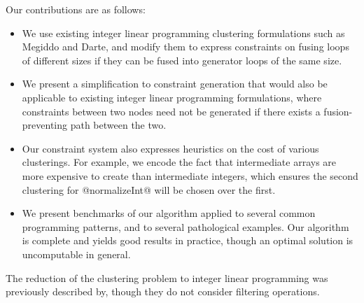 Our contributions are as follows:

\begin{itemize}
\item   
We use existing integer linear programming clustering formulations such as Megiddo\cite{megiddo1998optimal} and Darte\cite{darte2002contraction},
and modify them to express constraints on fusing loops of different sizes if they can be fused into generator loops of the same size.

\item
We present a simplification to constraint generation that would also be applicable to existing integer linear programming formulations,
where constraints between two nodes need not be generated if there exists a fusion-preventing path between the two. 

\item   Our constraint system also expresses heuristics on the cost of various clusterings. For example, we encode the fact that intermediate arrays are more expensive to create than intermediate integers, which ensures the second clustering for @normalizeInt@ will be chosen over the first. 

\item   We present benchmarks of our algorithm applied to several common programming patterns, and to several pathological examples. Our algorithm is complete and yields good results in practice, though an optimal solution is uncomputable in general. 
\end{itemize}

The reduction of the clustering problem to integer linear programming was previously described by\cite{megiddo1998optimal}, though they do not consider filtering operations.




